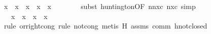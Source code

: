 \begin{isabellebody}
\ {}{}{}{}x{}\ {}\ {}{}{}{}{}{}{}x{}{}\ {}\ {}x{}\ {}\ {}{}{}{}{}{}{}x{}{}\ {}\ {}{}{}x{}{}{}\isanewline
\ \ \ \ \ \ \isamarkupfalse%
\ {}subst\ huntington{}OF\ nnxc\ nxc{}{}\ simp{}\isanewline
\ \ \ \ \isamarkupfalse%
\ \isamarkupfalse%
\ {}{}{}{}\ {}\ {}{}{}{}{}{}{}x{}{}\ {}\ {}x{}\ {}\ {}{}{}x\ {}\ x{}{}\isanewline
\ \ \ \ \ \ \isamarkupfalse%
\ {}rule\ or{}right{}cong{}\ rule\ not{}cong{}\ metis\ H{}\ assms\ comm\ hnot{}closed{}\isanewline

\end{isabellebody}
